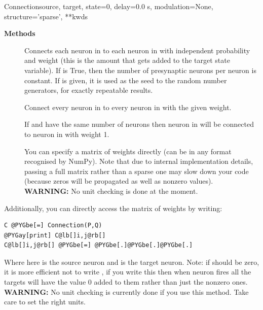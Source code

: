 \documentclass[letterpaper,10pt]{manual}
\begin{document}
\begin{classdesc}{Connection}{source, target, state=0, delay=0.0 s, modulation=None, structure='sparse', **kwds}
\begin{description}
\end{description}

\textbf{Methods}
\begin{description}
\item[]
Connects each neuron in  to each neuron in  with independent
probability  and weight  (this is the amount that
gets added to the target state variable). If  is True, then
the number of presynaptic neurons per neuron is constant. If 
is given, it is used as the seed to the random number generators, for
exactly repeatable results.

\item[]
Connect every neuron in  to every neuron in  with the given
weight.

\item[]
If  and  have the same number of neurons then neuron 
in  will be connected to neuron  in  with weight 1.

\item[]
You can specify a matrix of weights directly (can be in any format
recognised by NumPy). Note that due to internal implementation details,
passing a full matrix rather than a sparse one may slow down your code
(because zeros will be propagated as well as nonzero values).
\textbf{WARNING:} No unit checking is done at the moment.

\end{description}

Additionally, you can directly access the matrix of weights by writing:

\begin{Verbatim}[commandchars=@\[\]]
C @PYGbe[=] Connection(P,Q)
@PYGay[print] C@lb[]i,j@rb[]
C@lb[]i,j@rb[] @PYGbe[=] @PYGbe[.]@PYGbe[.]@PYGbe[.]
\end{Verbatim}

Where here  is the source neuron and  is the target neuron.
Note: if  should be zero, it is more efficient not to write
, if you write this then when neuron  fires all the
targets will have the value 0 added to them rather than just the
nonzero ones.
\textbf{WARNING:} No unit checking is currently done if you use this method.
Take care to set the right units.


\end{classdesc}
\end{document}
